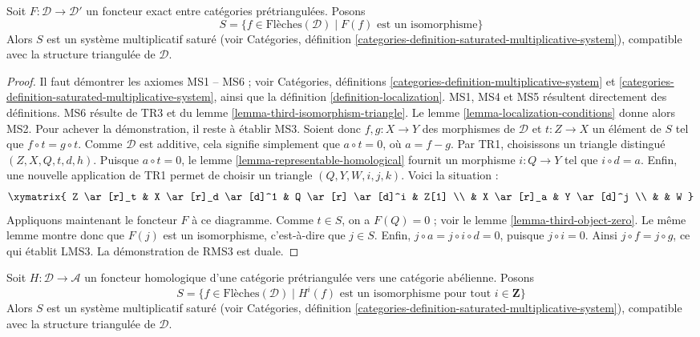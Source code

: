 \begin{lemma}
\label{lemma-triangle-functor-localize}
Soit $F : \mathcal{D} \to \mathcal{D}'$ un foncteur exact entre catégories
prétriangulées. Posons
$$
S = \{f \in \text{Flèches}(\mathcal{D})
\mid F(f)\text{ est un isomorphisme}\}
$$
Alors $S$ est un système multiplicatif saturé (voir Catégories, définition
\ref{categories-definition-saturated-multiplicative-system}), compatible avec
la structure triangulée de $\mathcal{D}$.
\end{lemma}

\begin{proof}
Il faut démontrer les axiomes MS1 -- MS6 ; voir Catégories, définitions
\ref{categories-definition-multiplicative-system} et
\ref{categories-definition-saturated-multiplicative-system}, ainsi que la
définition \ref{definition-localization}.
MS1, MS4 et MS5 résultent directement des définitions. MS6 résulte de TR3 et du
lemme \ref{lemma-third-isomorphism-triangle}.
Le lemme \ref{lemma-localization-conditions} donne alors MS2. Pour achever la
démonstration, il reste à établir MS3. Soient donc $f, g : X \to Y$ des
morphismes de $\mathcal{D}$ et $t : Z \to X$ un élément de $S$ tel que
$f \circ t = g \circ t$. Comme $\mathcal{D}$ est additive, cela signifie
simplement que $a \circ t = 0$, où $a = f - g$. Par TR1, choisissons un
triangle distingué $(Z, X, Q, t, d, h)$. Puisque $a \circ t = 0$, le
lemme \ref{lemma-representable-homological} fournit un morphisme
$i : Q \to Y$ tel que $i \circ d = a$. Enfin, une nouvelle application de TR1
permet de choisir un triangle $(Q, Y, W, i, j, k)$. Voici la situation :
$$
\xymatrix{
Z \ar[r]_t & X \ar[r]_d \ar[d]^1 & Q \ar[r] \ar[d]^i & Z[1] \\
& X \ar[r]_a & Y \ar[d]^j \\
& & W
}
$$
Appliquons maintenant le foncteur $F$ à ce diagramme.
Comme $t \in S$, on a $F(Q) = 0$ ; voir le
lemme \ref{lemma-third-object-zero}.
Le même lemme montre donc que $F(j)$ est un isomorphisme, c'est-à-dire que
$j \in S$. Enfin, $j \circ a = j \circ i \circ d = 0$, puisque
$j \circ i = 0$. Ainsi $j \circ f = j \circ g$, ce qui établit LMS3.
La démonstration de RMS3 est duale.
\end{proof}

\begin{lemma}
\label{lemma-homological-functor-localize}
Soit $H : \mathcal{D} \to \mathcal{A}$ un foncteur homologique d'une catégorie
prétriangulée vers une catégorie abélienne. Posons
$$
S = \{f \in \text{Flèches}(\mathcal{D})
\mid H^i(f)\text{ est un isomorphisme pour tout }i \in \mathbf{Z}\}
$$
Alors $S$ est un système multiplicatif saturé (voir Catégories, définition
\ref{categories-definition-saturated-multiplicative-system}), compatible avec
la structure triangulée de $\mathcal{D}$.
\end{lemma}

